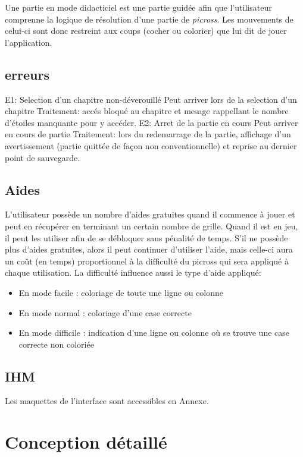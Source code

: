 \documentclass{report}
\begin{document}
	Une partie en mode didacticiel est une partie guidée afin que l'utilisateur comprenne la logique de résolution d'une partie de \textit{picross}. Les mouvements de celui-ci sont donc restreint aux coups (cocher ou colorier) que lui dit de jouer l'application.
	
	\section{erreurs}
	
		E1: Selection d'un chapitre non-déverouillé
			Peut arriver lors de la selection d'un chapitre
			Traitement: accés bloqué au chapitre et mesage rappellant le nombre d'étoiles manquante pour y accéder.
		E2: Arret de la partie en cours
			Peut arriver en cours de partie
			Traitement: lors du redemarrage de la partie, affichage d'un avertissement (partie quittée de façon non conventionnelle) et reprise au dernier point de sauvegarde.
			
  \section{Aides}

  L'utilisateur possède un nombre d'aides gratuites quand il commence à jouer et peut en récupérer en terminant un certain nombre de grille. Quand il est en jeu, il peut les utiliser afin de se débloquer sans pénalité de temps. S'il ne possède plus d'aides gratuites, alors il peut continuer d'utiliser l'aide, mais celle-ci aura un coût (en temps) proportionnel à la difficulté du picross qui sera appliqué à chaque utilisation. La difficulté influence aussi le type d'aide appliqué:
    \begin{itemize}
    \item En mode facile : coloriage de toute une ligne ou colonne
    \item En mode normal : coloriage d'une case correcte 
    \item En mode difficile : indication d'une ligne ou colonne où se trouve une case correcte non coloriée
    \end{itemize}


  \section{IHM}
  
  Les maquettes de l'interface sont accessibles en Annexe.
  
  
			
\chapter{Conception détaillé}
\end{document}
